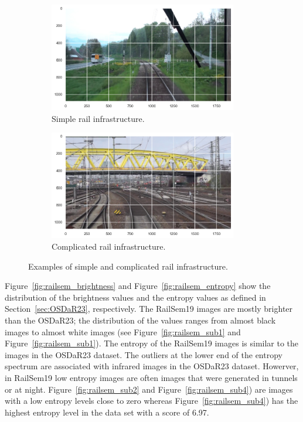 \documentclass[Master,MDS,english]{BASE/twbook} %
\begin{document}
\begin{figure}
\centering
\begin{subfigure}{.5\textwidth}
  \centering
  \includegraphics[width=0.9\textwidth]{images/datasets/railsem/example_2_tracks}
  \caption{Simple rail infrastructure.}
\end{subfigure}%
\begin{subfigure}{.5\textwidth}
  \centering
  \includegraphics[width=0.9\textwidth]{images/datasets/railsem/example_52_tracks}
  \caption{Complicated rail infrastructure. }
\end{subfigure}
\caption{Examples of simple and complicated rail infrastructure.}
\label{fig:railsem_complicated_vs_simple}
\end{figure}


Figure~\ref{fig:railsem_brightness} and  Figure~\ref{fig:railsem_entropy} show the distribution of the brightness values and the entropy values as defined in Section~\ref{sec:OSDaR23}, respectively. The RailSem19 images are mostly brighter than the OSDaR23; the distribution of the values ranges from almost black images to almost white images (see Figure~\ref{fig:railsem_sub1} and Figure~\ref{fig:railsem_sub1}). The entropy of the RailSem19 images is similar to the images in the OSDaR23 dataset. The outliers at the lower end of the entropy spectrum are associated with infrared images in the OSDaR23 dataset. Howerver, in RailSem19 low entropy images are often images that were generated in tunnels or at night. Figure~\ref{fig:railsem_sub2} and Figure~\ref{fig:railsem_sub4}) are images with a low entropy levels close to zero whereas Figure~\ref{fig:railsem_sub4}) has the highest entropy level in the data set with a score of 6.97.
\end{document}
